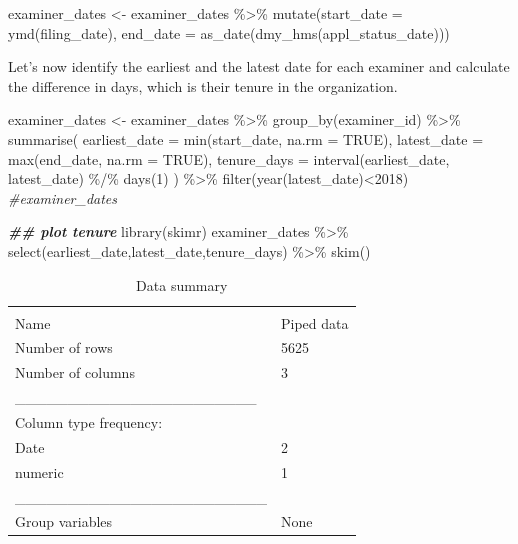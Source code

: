 \documentclass[
]{article}
\newenvironment{Shaded}{\begin{snugshade}}{\end{snugshade}}
\newcommand{\AttributeTok}[1]{\textcolor[rgb]{0.77,0.63,0.00}{#1}}
\newcommand{\CommentTok}[1]{\textcolor[rgb]{0.56,0.35,0.01}{\textit{#1}}}
\newcommand{\ConstantTok}[1]{\textcolor[rgb]{0.00,0.00,0.00}{#1}}
\newcommand{\DecValTok}[1]{\textcolor[rgb]{0.00,0.00,0.81}{#1}}
\newcommand{\DocumentationTok}[1]{\textcolor[rgb]{0.56,0.35,0.01}{\textbf{\textit{#1}}}}
\newcommand{\FunctionTok}[1]{\textcolor[rgb]{0.00,0.00,0.00}{#1}}
\newcommand{\NormalTok}[1]{#1}
\newcommand{\OtherTok}[1]{\textcolor[rgb]{0.56,0.35,0.01}{#1}}
\newcommand{\SpecialCharTok}[1]{\textcolor[rgb]{0.00,0.00,0.00}{#1}}
\begin{document}
\begin{Shaded}
\begin{Highlighting}[]
\NormalTok{examiner\_dates }\OtherTok{\textless{}{-}}\NormalTok{ examiner\_dates }\SpecialCharTok{\%\textgreater{}\%} 
  \FunctionTok{mutate}\NormalTok{(}\AttributeTok{start\_date =} \FunctionTok{ymd}\NormalTok{(filing\_date), }\AttributeTok{end\_date =} \FunctionTok{as\_date}\NormalTok{(}\FunctionTok{dmy\_hms}\NormalTok{(appl\_status\_date)))}
\end{Highlighting}
\end{Shaded}

Let's now identify the earliest and the latest date for each examiner
and calculate the difference in days, which is their tenure in the
organization.

\begin{Shaded}
\begin{Highlighting}[]
\NormalTok{examiner\_dates }\OtherTok{\textless{}{-}}\NormalTok{ examiner\_dates }\SpecialCharTok{\%\textgreater{}\%} 
  \FunctionTok{group\_by}\NormalTok{(examiner\_id) }\SpecialCharTok{\%\textgreater{}\%} 
  \FunctionTok{summarise}\NormalTok{(}
    \AttributeTok{earliest\_date =} \FunctionTok{min}\NormalTok{(start\_date, }\AttributeTok{na.rm =} \ConstantTok{TRUE}\NormalTok{), }
    \AttributeTok{latest\_date =} \FunctionTok{max}\NormalTok{(end\_date, }\AttributeTok{na.rm =} \ConstantTok{TRUE}\NormalTok{),}
    \AttributeTok{tenure\_days =} \FunctionTok{interval}\NormalTok{(earliest\_date, latest\_date) }\SpecialCharTok{\%/\%} \FunctionTok{days}\NormalTok{(}\DecValTok{1}\NormalTok{)}
\NormalTok{    ) }\SpecialCharTok{\%\textgreater{}\%} 
  \FunctionTok{filter}\NormalTok{(}\FunctionTok{year}\NormalTok{(latest\_date)}\SpecialCharTok{\textless{}}\DecValTok{2018}\NormalTok{)}
\CommentTok{\#examiner\_dates}

\DocumentationTok{\#\# plot tenure}
\FunctionTok{library}\NormalTok{(skimr)}
\NormalTok{examiner\_dates }\SpecialCharTok{\%\textgreater{}\%} 
  \FunctionTok{select}\NormalTok{(earliest\_date,latest\_date,tenure\_days) }\SpecialCharTok{\%\textgreater{}\%} 
  \FunctionTok{skim}\NormalTok{()}
\end{Highlighting}
\end{Shaded}

\begin{longtable}[]{@{}ll@{}}
\caption{Data summary}\tabularnewline
\toprule
& \\
\midrule
\endfirsthead
\toprule
& \\
\midrule
\endhead
Name & Piped data \\
Number of rows & 5625 \\
Number of columns & 3 \\
\_\_\_\_\_\_\_\_\_\_\_\_\_\_\_\_\_\_\_\_\_\_\_ & \\
Column type frequency: & \\
Date & 2 \\
numeric & 1 \\
\_\_\_\_\_\_\_\_\_\_\_\_\_\_\_\_\_\_\_\_\_\_\_\_ & \\
Group variables & None \\
\bottomrule
\end{longtable}
\end{document}
